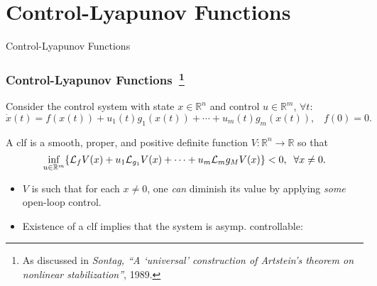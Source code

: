 \section{Control-Lyapunov Functions}

\begin{frame}
    Control-Lyapunov Functions


\end{frame}

\begingroup
\small

\begin{frame}
    \frametitle{Control-Lyapunov Functions~\footnote[1]{As discussed in
        \textit{Sontag, ``A `universal' construction of Artstein's theorem on
        nonlinear stabilization''}, 1989.}}

    Consider the control system with state $x \in \mathbb{R}^n$ and control
    $u \in \mathbb{R}^m$, $\forall t$:
    \begin{equation}
        \dot{x}(t) = f(x(t)) + u_1(t)g_1(x(t)) + \cdots + u_m(t)g_m(x(t)), \;\;\; f(0) = 0.
        \label{eq:ctrl_system}
    \end{equation}

    \begin{definition}
        A clf is a smooth, proper, and positive definite function $ V:
        \mathbb{R}^n \rightarrow \mathbb{R} $ so that
        \[\inf_{u \in \mathbb{R}^m}\{ \mathcal{L}_fV(x) + u_1 \mathcal{L}_{g_1}V(x) +
        \cdots + u_m \mathcal{L}_mg_M V(x) \} < 0, \;\; \forall x \neq 0. \]
    \end{definition}

    \vspace{-3mm}
    \begin{itemize}
        \item $V$ is such that for each $x \neq 0$, one \textit{can} diminish
        its value by applying \textit{some} open-loop control.
        \item Existence of a clf implies that the system is asymp. controllable: 
    \end{itemize}
    \vspace{2mm}
\end{frame}


